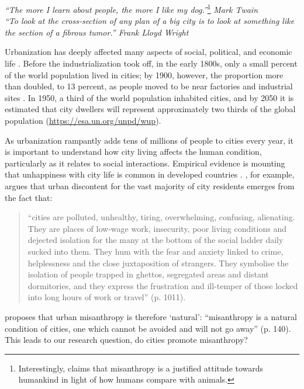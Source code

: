 \documentclass[11pt, letterpaper]{article}
\newcommand{\emd}[1]{\ExecuteMetaData[/tmp/tex]{#1}} %
\begin{document}
\begin{spacing}{1.4} %
\vspace{.25in}

{\small\it \noindent ``The more I learn about people, the more I like my dog.''}\footnote{Interestingly, \citet{cooper2018animals} claims that misanthropy is a justified attitude towards humankind in light of how humans %
    compare with animals.} {\small\it Mark Twain}\\[0.3em]

{\small\it \noindent ``To look at the
 cross-section of any plan of a big city is to look at something like the
 section of a fibrous tumor.'' Frank Lloyd Wright\\}


Urbanization has deeply affected many aspects of social, political, and economic life \citep{kleniewski2010cities}. 
Before the industrialization took off, in the early 1800s, only a small percent of the world population lived in cities; by 1900, however, the proportion more than doubled, to 13 percent, as people moved to be near factories and industrial sites
\citep{davis55}. In 1950, a third of the world population inhabited cities, and by 2050 it is estimated that city dwellers will represent approximately two thirds of the global population (\url{https://esa.un.org/unpd/wup}). 
 
As urbanization rampantly adds tens of millions of people to cities every year,
it is important to understand how city living affects the human condition,
particularly as it relates to social interactions. Empirical evidence is mounting that unhappiness with city life is common in developed countries \citep{aokCityBook15,sorensen14,morrison17,ala18,aok-val20}. \citet[]{amin06}, for example, argues that urban discontent for the vast majority of city residents emerges from the fact that:
\begin{quote}  ``cities are polluted,
  unhealthy, tiring, overwhelming, confusing, alienating. They are places of low-wage work, insecurity, poor living conditions and dejected isolation for the many at the bottom of the social ladder daily sucked into them. They hum with the fear and anxiety linked to crime, helplessness and the close juxtaposition of strangers. They symbolise the isolation of people trapped in ghettos, segregated areas and distant dormitories, and they express the frustration and ill-temper of those locked into long hours of work or travel'' (p. 1011).\end{quote}
 \citet[]{thrift05} proposes that urban misanthropy is therefore `natural': ``misanthropy is a natural condition of cities, one which cannot be avoided and will not go away'' (p. 140). This leads to our research question, do cities promote misanthropy?
  

\end{spacing}
\end{document}
